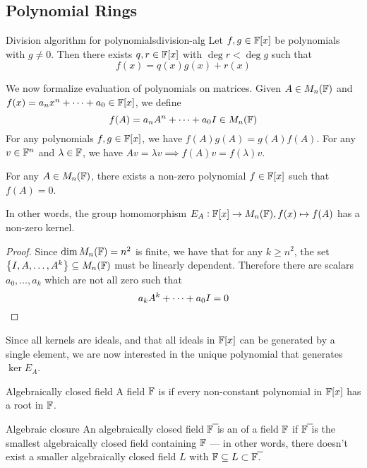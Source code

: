 \documentclass{styles/tufte}
\begin{document}
\subsection{Polynomial Rings}

  \begin{theorem}{Division algorithm for polynomials}{division-alg}
    Let $f, g \in \mathbb{F}[x]$ be polynomials with $g \neq 0$. Then there exists $q, r \in \mathbb{F}[x]$ with $\deg r < \deg g$ such that
    \[ f(x) = q(x) g(x) + r(x) \]
  \end{theorem}
  
  We now formalize evaluation of polynomials on matrices. Given $A \in M_n(\mathbb{F})$ and $f(x) = a_n x^n + \dots + a_0 \in \mathbb{F}[x]$, we define
  \[ f(A) = a_n A^n + \dots + a_0 I \in M_n(\mathbb{F}) \]
  For any polynomials $f, g \in \mathbb{F}[x]$, we have $f(A) g(A) = g(A) f(A)$. For any $v \in \mathbb{F}^n$ and $\lambda \in \mathbb{F}$, we have $Av = \lambda v \implies f(A) v = f(\lambda) v$.
  
  \begin{lemma}{}{}
    For any $A \in M_n(\mathbb{F})$, there exists a non-zero polynomial $f \in \mathbb{F}[x]$ such that $f(A) = 0$.
    
    In other words, the group homomorphism $E_A: \mathbb{F}[x] \to M_n(\mathbb{F}), f(x) \mapsto f(A)$ has a non-zero kernel.
  \end{lemma}
  \begin{proof}
    Since $\dim M_n(\mathbb{F}) = n^2$ is finite, we have that for any $k \geqslant n^2$, the set $\set{I, A, \dots, A^k} \subseteq M_n(\mathbb{F})$ must be linearly dependent. Therefore there are scalars $a_0, \dots, a_k$ which are not all zero such that
    \[ a_k A^k + \dots + a_0 I = 0 \qedhere \]
  \end{proof}
  
  Since all kernels are ideals, and that all ideals in $\mathbb{F}[x]$ can be generated by a single element, we are now interested in the unique polynomial that generates $\ker E_A$.
  
  \begin{definition}{Algebraically closed field}{}
    A field $\mathbb{F}$ is  if every non-constant polynomial in $\mathbb{F}[x]$ has a root in $\mathbb{F}$.
  \end{definition}
  
  \begin{definition}{Algebraic closure}{}
    An algebraically closed field $\overline{\FF}$ is an  of a field $\mathbb{F}$ if $\overline{\FF}$ is the smallest algebraically closed field containing $\mathbb{F}$ --- in other words, there doesn't exist a smaller algebraically closed field $L$ with $\FF \subseteq L \subset \overline{\FF}$.
  \end{definition}
  
\end{document}
